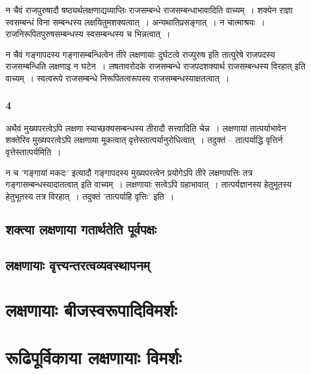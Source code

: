 				\begin{small}
			
					न चैवं राजपुरुषादौ षष्ठ्यर्थलक्षणाद्यव्याप्तिः राजसम्बन्धे राजसम्बन्धाभावादिति वाच्यम्~। शक्येन राज्ञा स्वसम्बन्धं विना सम्बन्धस्य लक्षयितुमशक्यत्वात्~। अन्यथातिप्रसङ्गात्~। न चात्माश्रयः~। राजनिरूपितपुरुषसम्बन्धस्य स्वसम्बन्धस्य च भिन्नत्वात्~। 
				\end{small}
				
				न चैवं	गङ्गापदस्य गङ्गासम्बन्धित्वेन तीरे लक्षणायाः दुर्घटत्वे राज्पुरुष इति तात्पुरेषे राजपदस्य राजसम्बन्धिति लक्षणाइ न घटेन~। लषतावरोदके राजसम्बन्धे राजपदशक्यार्थ राजसम्बन्धस्य विरहात् इति वाच्यम्~। स्वत्वरूपे राजसम्बन्धे निरूपितत्वरूपस्य राजसम्बन्धस्याक्षतत्वात्~।
			
			\subsubsection{4}

				\begin{small}
			
					अथैवं मुख्यपरत्वेऽपि लक्षणा स्याच्छक्यसम्बन्धस्य तीरादौ सत्त्वादिति चेन्न~। लक्षणायां तात्पर्याभावेन शक्तेरिव मुख्यपरत्वेऽपि लक्षणाया मूकत्वात् वृत्तेस्तात्पर्यानुरोधित्वात्~। तदुक्तं – तात्पर्याद्धि वृत्तिर्न वृत्तेस्तात्पर्यमिति~। 
				\end{small}

				न च ’गङ्गायां मकदः’ इत्यादौ गङ्गापदस्य मुख्यपरत्वेन प्रयोगेऽपि तीरे लक्षणापत्तिः तत्र  गङ्गासम्बन्धस्यादातत्वात् इति वाच्यम्~। लक्षणायाः सत्वेऽपि ग्रहाभावात्~। तात्पर्यज्ञानस्य हेतुभूतस्य हेतुभूतस्य तत्र विरहात्~। तदुक्तं ’तात्पर्याहि वृत्तिः’ इति~।
			
		\subsection{शक्त्या लक्षणाया गतार्थतेति पूर्वपक्षः}
		
		\subsection{लक्षणायाः वृत्त्यन्तरत्वव्यवस्थापनम्}
		
	\section{लक्षणायाः बीजस्वरूपादिविमर्शः}
	
	\section{रूढिपूर्विकाया लक्षणायाः विमर्शः}
		
